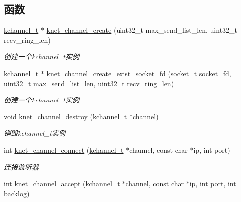 \subsection*{函数}
\begin{DoxyCompactItemize}
\item 
\hyperlink{a00066_aca9cd34897582aa9969245a93cc62fb5_aca9cd34897582aa9969245a93cc62fb5}{kchannel\+\_\+t} $\ast$ \hyperlink{a00061_af1bfbfb5240375789fcc89b087280ad8_af1bfbfb5240375789fcc89b087280ad8}{knet\+\_\+channel\+\_\+create} (uint32\+\_\+t max\+\_\+send\+\_\+list\+\_\+len, uint32\+\_\+t recv\+\_\+ring\+\_\+len)
\begin{DoxyCompactList}\small\item\em 创建一个kchannel\+\_\+t实例 \end{DoxyCompactList}\item 
\hyperlink{a00066_aca9cd34897582aa9969245a93cc62fb5_aca9cd34897582aa9969245a93cc62fb5}{kchannel\+\_\+t} $\ast$ \hyperlink{a00061_a6cfbae713bcd155703df7871a978dda6_a6cfbae713bcd155703df7871a978dda6}{knet\+\_\+channel\+\_\+create\+\_\+exist\+\_\+socket\+\_\+fd} (\hyperlink{a00066_a0d9e0afbf02fb6ed6c5b1415dce51b05_a0d9e0afbf02fb6ed6c5b1415dce51b05}{socket\+\_\+t} socket\+\_\+fd, uint32\+\_\+t max\+\_\+send\+\_\+list\+\_\+len, uint32\+\_\+t recv\+\_\+ring\+\_\+len)
\begin{DoxyCompactList}\small\item\em 创建一个kchannel\+\_\+t实例 \end{DoxyCompactList}\item 
void \hyperlink{a00061_ad6e14ad79303e00c50f1231bdf2447ff_ad6e14ad79303e00c50f1231bdf2447ff}{knet\+\_\+channel\+\_\+destroy} (\hyperlink{a00066_aca9cd34897582aa9969245a93cc62fb5_aca9cd34897582aa9969245a93cc62fb5}{kchannel\+\_\+t} $\ast$channel)
\begin{DoxyCompactList}\small\item\em 销毁kchannel\+\_\+t实例 \end{DoxyCompactList}\item 
int \hyperlink{a00061_a0b4008dc5d3faa3a445942b1eabe499f_a0b4008dc5d3faa3a445942b1eabe499f}{knet\+\_\+channel\+\_\+connect} (\hyperlink{a00066_aca9cd34897582aa9969245a93cc62fb5_aca9cd34897582aa9969245a93cc62fb5}{kchannel\+\_\+t} $\ast$channel, const char $\ast$ip, int port)
\begin{DoxyCompactList}\small\item\em 连接监听器 \end{DoxyCompactList}\item 
int \hyperlink{a00061_a719cb5a1d455fe1af74348effd93ec6f_a719cb5a1d455fe1af74348effd93ec6f}{knet\+\_\+channel\+\_\+accept} (\hyperlink{a00066_aca9cd34897582aa9969245a93cc62fb5_aca9cd34897582aa9969245a93cc62fb5}{kchannel\+\_\+t} $\ast$channel, const char $\ast$ip, int port, int backlog)

\end{DoxyCompactItemize}
